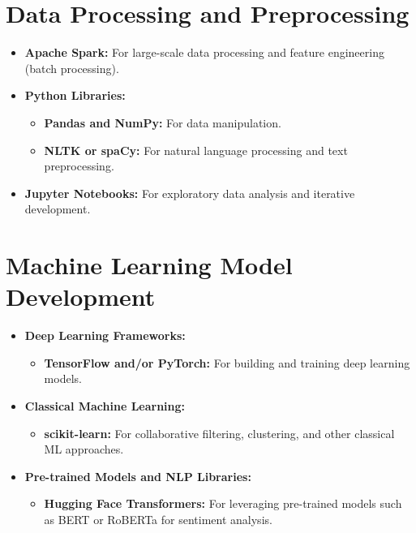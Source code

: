 \documentclass[11pt]{article}
\begin{document}
\section{Data Processing and Preprocessing}
\begin{itemize}[noitemsep]
    \item \textbf{Apache Spark:} For large-scale data processing and feature engineering (batch processing).
    \item \textbf{Python Libraries:} 
    \begin{itemize}[noitemsep]
        \item \textbf{Pandas and NumPy:} For data manipulation.
        \item \textbf{NLTK or spaCy:} For natural language processing and text preprocessing.
    \end{itemize}
    \item \textbf{Jupyter Notebooks:} For exploratory data analysis and iterative development.
\end{itemize}

\section{Machine Learning Model Development}
\begin{itemize}[noitemsep]
    \item \textbf{Deep Learning Frameworks:} 
    \begin{itemize}[noitemsep]
        \item \textbf{TensorFlow and/or PyTorch:} For building and training deep learning models.
    \end{itemize}
    \item \textbf{Classical Machine Learning:} 
    \begin{itemize}[noitemsep]
        \item \textbf{scikit-learn:} For collaborative filtering, clustering, and other classical ML approaches.
    \end{itemize}
    \item \textbf{Pre-trained Models and NLP Libraries:} 
    \begin{itemize}[noitemsep]
        \item \textbf{Hugging Face Transformers:} For leveraging pre-trained models such as BERT or RoBERTa for sentiment analysis.
    \end{itemize}
\end{itemize}
\end{document}
